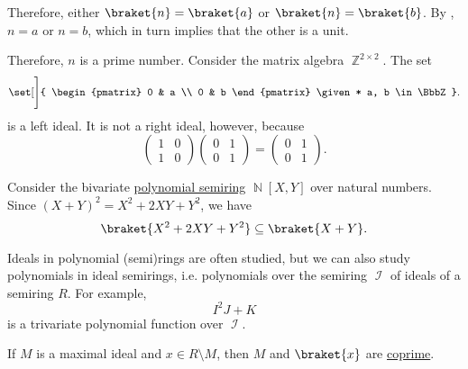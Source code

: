 \begin{example}
\begin{thmenum}
    Therefore, either \( \braket{ n } = \braket{ a } \) or \( \braket{ n } = \braket{ b } \). By , \( n = a \) or \( n = b \), which in turn implies that the other is a unit.

    Therefore, \( n \) is a prime number.
     Consider the matrix algebra \( \BbbZ^{2 \times 2} \). The set
    \begin{equation*}
      \set[\Bigg]
      {
        \begin{pmatrix}
          0 & a \\
          0 & b
        \end{pmatrix}
        \given*
        a, b \in \BbbZ
      }.
    \end{equation*}
    is a left ideal. It is not a right ideal, however, because
    \begin{equation*}
      \begin{pmatrix}
        1 & 0 \\
        1 & 0
      \end{pmatrix}
      \begin{pmatrix}
        0 & 1 \\
        0 & 1
      \end{pmatrix}
      =
      \begin{pmatrix}
        0 & 1 \\
        0 & 1
      \end{pmatrix}.
    \end{equation*}

     Consider the bivariate \hyperref[def:polynomial_semiring]{polynomial semiring} \( \BbbN[X, Y] \) over natural numbers. Since \( (X + Y)^2 = X^2 + 2XY + Y^2 \), we have
    \begin{equation*}
      \braket{ X^2 + 2XY + Y^2 } \subseteq \braket{ X + Y }.
    \end{equation*}

     Ideals in polynomial (semi)rings are often studied, but we can also study polynomials in ideal semirings, i.e. polynomials over the semiring \( \mscrI \) of ideals of a semiring \( R \). For example,
    \begin{equation*}
      I^2 J + K
    \end{equation*}
    is a trivariate polynomial function over \( \mscrI \).

     If \( M \) is a maximal ideal and \( x \in R \setminus M \), then \( M \) and \( \braket{ x } \) are \hyperref[def:semiring_ideal/coprime]{coprime}.
  \end{thmenum}
\end{example}

